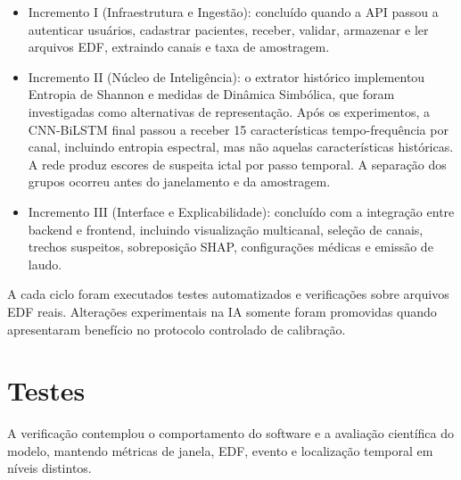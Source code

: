 \begin{itemize}[leftmargin=1.25cm,itemsep=0pt,topsep=0pt]
\item Incremento I (Infraestrutura e Ingestão): concluído quando a API passou a autenticar usuários, cadastrar pacientes, receber, validar, armazenar e ler arquivos EDF, extraindo canais e taxa de amostragem.
\item Incremento II (Núcleo de Inteligência): o extrator histórico implementou Entropia de Shannon e medidas de Dinâmica Simbólica, que foram investigadas como alternativas de representação. Após os experimentos, a CNN-BiLSTM final passou a receber 15 características tempo-frequência por canal, incluindo entropia espectral, mas não aquelas características históricas. A rede produz escores de suspeita ictal por passo temporal. A separação dos grupos ocorreu antes do janelamento e da amostragem.
\item Incremento III (Interface e Explicabilidade): concluído com a integração entre backend e frontend, incluindo visualização multicanal, seleção de canais, trechos suspeitos, sobreposição SHAP, configurações médicas e emissão de laudo.
\end{itemize}
A cada ciclo foram executados testes automatizados e verificações sobre arquivos EDF reais. Alterações experimentais na IA somente foram promovidas quando apresentaram benefício no protocolo controlado de calibração.

\section{Testes}
A verificação contemplou o comportamento do software e a avaliação científica do modelo, mantendo métricas de janela, EDF, evento e localização temporal em níveis distintos.


